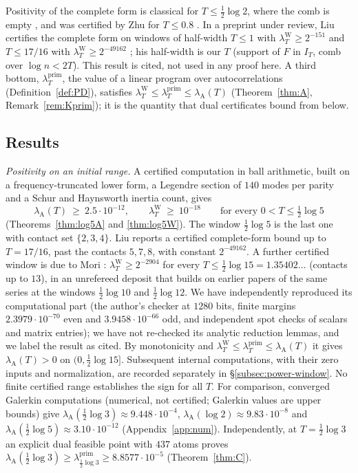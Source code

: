 \documentclass[11pt]{amsart}
\theoremstyle{definition}
\theoremstyle{remark}
\newcommand{\IT}{I_T}
\newcommand{\lamP}{\lambda^{\mathrm{prim}}_T}
\newcommand{\lamW}{\lambda^{\mathrm W}_T}
\newcommand{\lamA}{\lambda_{\mathrm A}(T)}
\begin{document}
Positivity of the complete form is classical for $T\le\frac12\log2$, where the comb is empty
\cite{Yoshida1992,Bombieri2000}, and was certified by Zhu for $T\le0.8$ \cite[Thm.~1.2]{Zhu2026}. In a preprint under review, Liu certifies the
complete form on windows of half-width $T\le1$ with $\lamW\ge2^{-151}$ and $T\le17/16$ with
$\lamW\ge2^{-49162}$ \cite[Thms.~A, B]{Liu2026}; his half-width is our $T$ (support of $F$ in $\IT$, comb
over $\log n<2T$). This result is cited, not used in any proof here. A
third bottom, $\lamP$, the value of a linear program over autocorrelations (Definition~\ref{def:PD}),
satisfies $\lamW\le\lamP\le\lamA$ (Theorem~\ref{thm:A}, Remark~\ref{rem:Kprim}); it is the quantity
that dual certificates bound from below.

\subsection{Results}
\emph{Positivity on an initial range.} A certified computation in ball arithmetic, built on a
frequency-truncated lower form, a Legendre section of $140$ modes per parity and a Schur and Haynsworth
inertia count, gives
\[
\lamA\ \ge\ 2.5\cdot10^{-12},\qquad \lamW\ \ge\ 10^{-18}\qquad\text{for every }0<T\le\tfrac12\log5
\]
(Theorems~\ref{thm:log5A} and \ref{thm:log5W}). The window $\frac12\log5$ is the last one with contact
set $\{2,3,4\}$. Liu \cite{Liu2026} reports a certified complete-form bound up to $T=17/16$, past the
contacts $5,7,8$, with constant $2^{-49162}$. A further certified window is due to Mori
\cite{Mori15}: $\lamW\ge2^{-2904}$ for every $T\le\frac12\log15=1.35402\ldots$ (contacts up to $13$), in
an unrefereed deposit that builds on earlier papers of the same series at the windows $\frac12\log10$ and
$\frac12\log12$. We have independently reproduced its computational part (the author's checker at
$1280$ bits, finite margins $2.3979\cdot10^{-70}$ even and $3.9458\cdot10^{-66}$ odd, and independent
spot checks of scalars and matrix entries); we have not re-checked its analytic reduction lemmas, and we
label the result as cited. By monotonicity and $\lamW\le\lamP\le\lamA$ it gives $\lamA>0$ on
$(0,\frac12\log15]$. Subsequent internal computations, with their zero inputs and normalization,
are recorded separately in \S\ref{subsec:power-window}. No finite certified range establishes the sign for all $T$. For comparison, converged Galerkin computations (numerical, not certified; Galerkin
values are upper bounds) give $\lambda_{\mathrm A}(\frac12\log3)\approx9.448\cdot10^{-4}$,
$\lambda_{\mathrm A}(\log2)\approx9.83\cdot10^{-8}$ and $\lambda_{\mathrm A}(\frac12\log5)\approx3.10\cdot10^{-12}$
(Appendix~\ref{app:num}). Independently, at $T=\frac12\log3$ an explicit dual feasible point with $437$
atoms proves $\lambda_{\mathrm A}(\frac12\log3)\ge\lambda^{\mathrm{prim}}_{\frac12\log3}\ge8.8577\cdot10^{-5}$
(Theorem~\ref{thm:C}).
\end{document}
